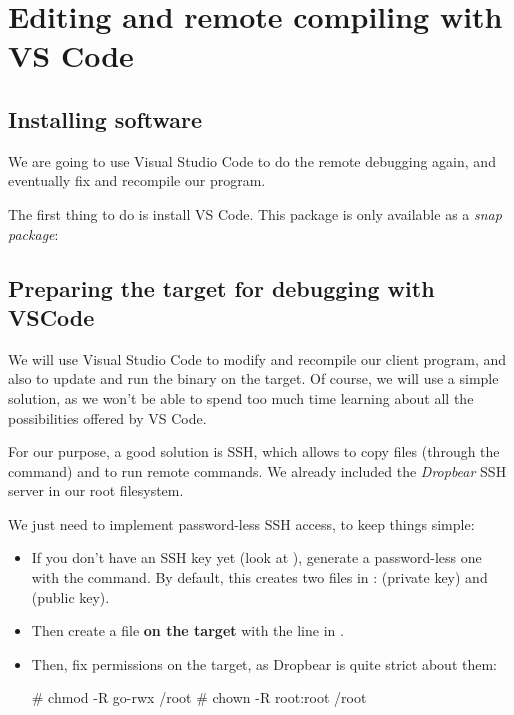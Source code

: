 \section{Editing and remote compiling with VS Code}

\subsection{Installing software}

We are going to use Visual Studio Code to do the remote debugging
again, and eventually fix and recompile our program.

The first thing to do is install VS Code. This package is only available
as a {\em snap package}:


\subsection{Preparing the target for debugging with VSCode}

We will use Visual Studio Code to modify and recompile our client
program, and also to update and run the binary on the target.
Of course, we will use a simple solution, as we won't be able to
spend too much time learning about all the possibilities offered
by VS Code.

For our purpose, a good solution is SSH, which allows to copy files
(through the  command) and to run remote commands. We already
included the {\em Dropbear} SSH server in our root filesystem.

We just need to implement password-less SSH access, to keep things
simple:

\begin{itemize}
  \item If you don't have an SSH key yet (look at ),
	generate a password-less one with the  command.
	By default, this creates two files in :
	 (private key) and  (public key).
  \item Then create a  file {\bf on the target}
        with the line in .
  \item Then, fix permissions on the target, as Dropbear is quite strict
        about them:
        \begin{bashinput}
# chmod -R go-rwx /root
# chown -R root:root /root
        \end{bashinput}
\end{itemize}

